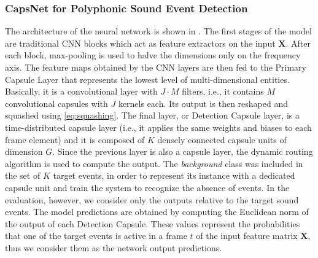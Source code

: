 \subsubsection{CapsNet for Polyphonic Sound Event Detection}
The architecture of the neural network is shown in . The first stages of the model are traditional CNN blocks which act as feature extractors on the input $\mathbf{X}$.
After each block, max-pooling is used to halve the dimensions only on the frequency axis. The feature maps obtained by the CNN layers are then fed to the Primary Capsule Layer that represents the lowest level of multi-dimensional entities. Basically, it is a convolutional layer with $J \cdot M$ filters, i.e., it contains $M$ convolutional capsules with $J$ kernels each. Its output is then reshaped and squashed using \eqref{eq:squashing}. The final layer, or Detection Capsule layer, is a time-distributed capsule layer (i.e., it applies the same weights and biases to each frame element) and it is composed of $K$ densely connected capsule units of dimension $G$.
Since the previous layer is also a capsule layer, the dynamic routing algorithm is used to compute the output. 
The \textit{background} class was included in the set of $K$ target events, in order to represent its instance with a dedicated capsule unit and train the system to recognize the absence of events. In the evaluation, however, we consider only the outputs relative to the target sound events.
The model predictions are obtained by computing the Euclidean norm of the output of each Detection Capsule. These values represent the probabilities that one of the target events is active in a frame $t$ of the input feature matrix $\mathbf{X}$, thus we consider them as the network output predictions.

